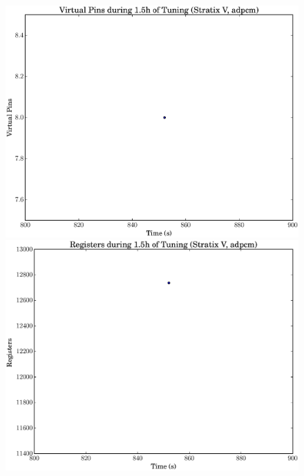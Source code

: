 \documentclass[12pt, a4paper]{article}
\begin{document}
\begin{figure}[htpb]
    \begin{minipage}{.48\textwidth}
        \includegraphics[scale=.25]{adpcm_pins_5400_chstone_StratixV}
    \end{minipage}%
    \hfill
    \begin{minipage}{.48\textwidth}
        \includegraphics[scale=.25]{adpcm_regs_5400_chstone_StratixV}
    \end{minipage}%


\end{figure}
\end{document}
